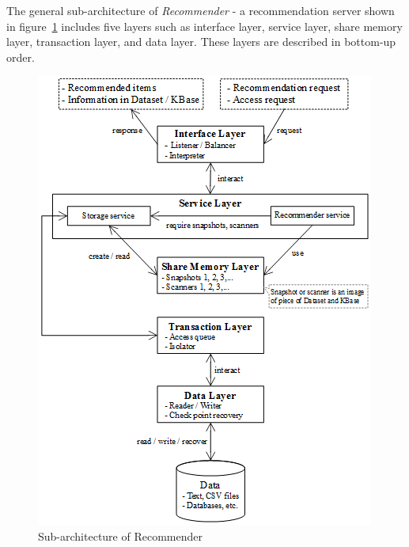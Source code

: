\documentclass[a4paper,twoside]{article}
\begin{document}
The general sub-architecture of \textit{Recommender} - a recommendation server shown in figure~\ref{figure:recommender-subarchitecture} includes five layers such as interface layer, service layer, share memory layer, transaction layer, and data layer. These layers are described in bottom-up order.
\begin{figure}
\centering
\includegraphics{ServerGeneralArchitecture.png}
\caption{Sub-architecture of Recommender}
\label{figure:recommender-subarchitecture}
\end{figure}
\end{document}
